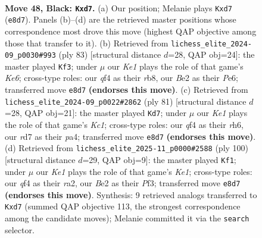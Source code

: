 \documentclass[11pt]{article}
\begin{document}
\clearpage

\begin{figure}[p]\centering
\begin{subfigure}{0.46\textwidth}\centering
\resizebox{\linewidth}{!}{%
\newchessgame
\chessboard[
  setfen={4k3/1p1R4/8/8/r3PQ2/8/4b1PP/1K6 b - - 2 48},
  showmover=false,
  pgfstyle=straightmove, color=movearrow, markmove={e8-d7}
]}
\caption{}
\end{subfigure}\hfill
\begin{subfigure}{0.46\textwidth}\centering
\resizebox{\linewidth}{!}{%
\newchessgame
\chessboard[
  setfen={1R6/7p/1P2p3/8/8/4k1PP/1r6/6K1 b - - 0 42},
  showmover=false,
  pgfstyle=straightmove, color=movearrow, markmove={e3-f3}
]}
\caption{}
\end{subfigure}
\\[4pt]
\begin{subfigure}{0.46\textwidth}\centering
\resizebox{\linewidth}{!}{%
\newchessgame
\chessboard[
  setfen={2k5/8/7R/8/PP2p3/8/1KP3rP/8 b - - 0 41},
  showmover=false,
  pgfstyle=straightmove, color=movearrow, markmove={c8-d7}
]}
\caption{}
\end{subfigure}\hfill
\begin{subfigure}{0.46\textwidth}\centering
\resizebox{\linewidth}{!}{%
\newchessgame
\chessboard[
  setfen={5k2/5p2/R7/p7/8/5P2/r5P1/4K3 w - - 2 51},
  showmover=false,
  pgfstyle=straightmove, color=movearrow, markmove={e1-f1}
]}
\caption{}
\end{subfigure}
\caption{\textbf{Move 48, Black: \texttt{Kxd7}.} (a) Our position; Melanie plays \texttt{Kxd7} (\texttt{e8d7}). Panels (b)--(d) are the retrieved master positions whose correspondence most drove this move (highest QAP objective among those that transfer to it). (b) Retrieved from \texttt{lichess\_elite\_2024-09\_p0030\#993} (ply 83) [structural distance $d$=28, QAP obj=24]: the master played \texttt{Kf3}; under $\mu$ our \emph{Ke1} plays the role of that game's \emph{Ke6}; cross-type roles: our \emph{q}f4 as their \emph{r}b8, our \emph{B}e2 as their \emph{P}e6; transferred move \texttt{e8d7} \textbf{(endorses this move)}. (c) Retrieved from \texttt{lichess\_elite\_2024-09\_p0022\#2862} (ply 81) [structural distance $d$=28, QAP obj=21]: the master played \texttt{Kd7}; under $\mu$ our \emph{Ke1} plays the role of that game's \emph{Kc1}; cross-type roles: our \emph{q}f4 as their \emph{r}h6, our \emph{r}d7 as their \emph{p}a4; transferred move \texttt{e8d7} \textbf{(endorses this move)}. (d) Retrieved from \texttt{lichess\_elite\_2025-11\_p0000\#2588} (ply 100) [structural distance $d$=29, QAP obj=9]: the master played \texttt{Kf1}; under $\mu$ our \emph{Ke1} plays the role of that game's \emph{Ke1}; cross-type roles: our \emph{q}f4 as their \emph{r}a2, our \emph{B}e2 as their \emph{P}f3; transferred move \texttt{e8d7} \textbf{(endorses this move)}. Synthesis: 9 retrieved analogs transferred to \texttt{Kxd7} (summed QAP objective 113, the strongest correspondence among the candidate moves); Melanie committed it via the \texttt{search} selector.}
\label{fig:thought-m95}
\end{figure}
\end{document}
